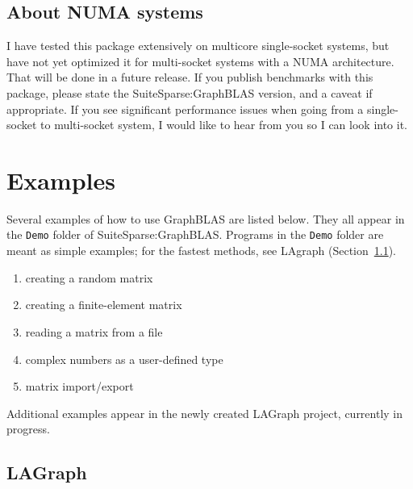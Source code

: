 \documentclass[12pt]{article}
\begin{document}
\subsection{About NUMA systems}

I have tested this package extensively on multicore single-socket systems, but
have not yet optimized it for multi-socket systems with a NUMA architecture.
That will be done in a future release.  If you publish benchmarks
with this package, please state the SuiteSparse:GraphBLAS version, and a caveat
if appropriate.  If you see significant performance issues when going from a
single-socket to multi-socket system, I would like to hear from you so I can
look into it.

\newpage
\section{Examples} %
\label{examples}

Several examples of how to use GraphBLAS are listed below.  They all
appear in the \verb'Demo' folder of SuiteSparse:GraphBLAS.  Programs in
the \verb'Demo' folder are meant as simple examples; for the fastest methods,
see LAgraph (Section~\ref{lagraph}).

\begin{enumerate}
\item creating a random matrix
\item creating a finite-element matrix
\item reading a matrix from a file
\item complex numbers as a user-defined type
\item matrix import/export
\end{enumerate}

Additional examples appear in the newly created LAGraph project, currently in
progress.

\subsection{LAGraph}
\label{lagraph}
\end{document}
